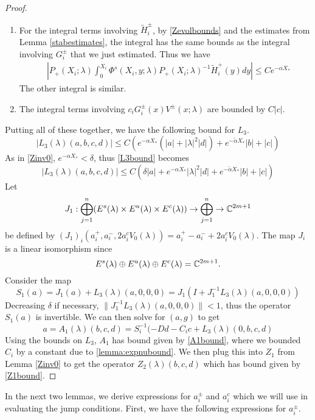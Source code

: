 \documentclass[thesis.tex]{subfiles}
\begin{document}
\begin{lemma}
\begin{proof}
\begin{enumerate}
\item For the integral terms involving $\tilde{H}_i^\pm$, by \eqref{Zevolbounds} and the estimates from Lemma \ref{stabestimates}, the integral has the same bounds as the integral involving $G_i^\pm$ that we just estimated. Thus we have
\begin{align*}
&\left|
P_+(X_i; \lambda) \int_0^{X_i} \Phi^s(X_i, y; \lambda) P_+(X_i; \lambda)^{-1} \tilde{H}_i^+(y) dy \right| \leq C e^{-\alpha X_*} 
\end{align*}
The other integral is similar.

\item The integral terms involving $c_i G_i^\pm(x) V^\pm(x; \lambda)$ are bounded by $C |c|$. 
\end{enumerate}

Putting all of these together, we have the following bound for $L_3$.
\begin{equation}\label{L3bound}
|L_3(\lambda)(a, b, c, d)| \leq C \left( e^{-\alpha X_*} (|a| + |\lambda|^2 |d|) + e^{-\tilde{\alpha} X_*} |b| + |c| \right)
\end{equation}
As in \cref{Zinv0}, $e^{-\alpha X_*} < \delta$, thus \cref{L3bound} becomes
\begin{equation*}
|L_3(\lambda)(a, b, c, d)| \leq C \left( \delta |a| + e^{-\alpha X_*}|\lambda|^2 |d| + e^{-\tilde{\alpha} X_*} |b| + |c| \right)
\end{equation*}
Let 
\[
J_1: \bigoplus_{j=1}^n (E^s(\lambda) \times E^u(
\lambda) \times E^c(\lambda) ) \rightarrow \bigoplus_{j=1}^n \rightarrow \mathbb{C}^{2m+1}
\]
be defined by $(J_1)_i(a_i^+, a_i^-, 2 a_i^c V_0(\lambda)) = a_i^+ - a_i^- + 2 a_i^c V_0(\lambda)$. The map $J_i$ is a linear isomorphism since 
\[
E^s(\lambda) \oplus E^u(\lambda) \oplus E^c(\lambda) = \mathbb{C}^{2m+1}.
\]
Consider the map
\[
S_1(a) = J_1(a) + L_3(\lambda)(a, 0, 0, 0) = J_1( I + J_1^{-1} L_3(\lambda)(a, 0, 0, 0))
\]
Decreasing $\delta$ if necessary, $\|J_1^{-1} L_3(\lambda)(a, 0, 0, 0)\| < 1$, thus the operator $S_1(a)$ is invertible. We can then solve for $(a, g)$ to get
\[
a = A_1(\lambda)(b, c, d) = S_i^{-1}(-D d - C_i c + L_3(\lambda)(0, b, c, d)
\]
Using the bounds on $L_3$, $A_1$ has bound given by \cref{A1bound}, where we bounded $C_i$ by a constant due to \cref{lemma:expnubound}. We then plug this into $Z_1$ from Lemma \ref{Zinv0} to get the operator $Z_2(\lambda)(b,c,d)$ which has bound given by \cref{Z1bound}.
\end{proof}
\end{lemma}

In the next two lemmas, we derive expressions for $a_i^\pm$ and $a_i^c$ which we will use in evaluating the jump conditions. First, we have the following expressions for $a_i^\pm$.
\end{document}
